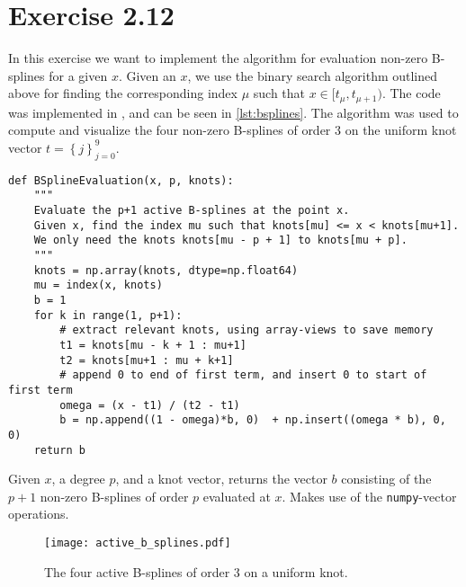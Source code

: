 \documentclass[a4paper]{article}
\begin{document}
    \section*{Exercise 2.12}
    
    In this exercise we want to implement the algorithm for evaluation non-zero
    B-splines for a given $x$. Given an $x$, we use the binary search algorithm
    outlined above for finding the corresponding index $\mu$ such that $x \in
    [t_\mu, t_{\mu+1})$. The code was implemented in , and can
    be seen in \cref{lst:bsplines}. The algorithm was used to compute and
    visualize the four non-zero B-splines of order $3$ on the uniform knot
    vector $t = \left\{j\right\}_{j=0}^9$.
    \begin{listing}
        \begin{verbatim} 
def BSplineEvaluation(x, p, knots):
    """
    Evaluate the p+1 active B-splines at the point x.
    Given x, find the index mu such that knots[mu] <= x < knots[mu+1].
    We only need the knots knots[mu - p + 1] to knots[mu + p].
    """ 
    knots = np.array(knots, dtype=np.float64)
    mu = index(x, knots)
    b = 1
    for k in range(1, p+1):
        # extract relevant knots, using array-views to save memory
        t1 = knots[mu - k + 1 : mu+1]
        t2 = knots[mu+1 : mu + k+1]
        # append 0 to end of first term, and insert 0 to start of first term
        omega = (x - t1) / (t2 - t1)
        b = np.append((1 - omega)*b, 0)  + np.insert((omega * b), 0, 0)
    return b
        \end{verbatim}
        \caption{Given $x$, a degree $p$, and a knot vector, returns the vector
        $b$ consisting of the $p+1$ non-zero B-splines of order $p$ evaluated
    at $x$. Makes use of the \texttt{numpy}-vector operations.}
    \label{lst:bsplines}
    \end{listing}
    
    \begin{figure}[htpb]
        \centering
        \texttt{[image: active\_b\_splines.pdf]}
        \caption{The four active B-splines of order 3 on a uniform knot.}
        \label{fig:active_b_splines.}
    \end{figure}
\end{document}
